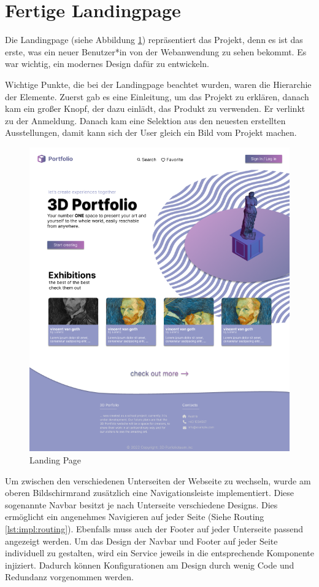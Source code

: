 \section{Fertige Landingpage}
Die Landingpage (siehe Abbildung \ref{fig:impl:finishedLandingpage}) repräsentiert das Projekt, denn es ist das erste, was ein neuer Benutzer*in von der Webanwendung zu sehen bekommt. Es war wichtig, ein modernes Design dafür zu entwickeln.

Wichtige Punkte, die bei der Landingpage beachtet wurden, waren die Hierarchie der Elemente. Zuerst gab es eine Einleitung, um das Projekt zu erklären, danach kam ein großer Knopf, der dazu einlädt, das Produkt zu verwenden. Er verlinkt zu der Anmeldung. Danach kam eine Selektion aus den neuesten erstellten Ausstellungen, damit kann sich der User gleich ein Bild vom Projekt machen.

\begin{figure}
    \centering
    \includegraphics[scale=.5]{pics/startingpage.png}
    \caption{Landing Page}
    \label{fig:impl:finishedLandingpage}
\end{figure}

Um zwischen den verschiedenen Unterseiten der Webseite zu wechseln, wurde am oberen Bildschirmrand zusätzlich eine Navigationsleiste implementiert. Diese sogenannte Navbar besitzt je nach Unterseite verschiedene Designs. Dies ermöglicht ein angenehmes Navigieren auf jeder Seite (Siehe Routing \ref{lst:impl:routing}). Ebenfalls muss auch der Footer auf jeder Unterseite passend angezeigt werden. Um das Design der Navbar und Footer auf jeder Seite individuell zu gestalten, wird ein Service jeweils in die entsprechende Komponente injiziert. Dadurch können Konfigurationen am Design durch wenig Code und Redundanz vorgenommen werden. 

